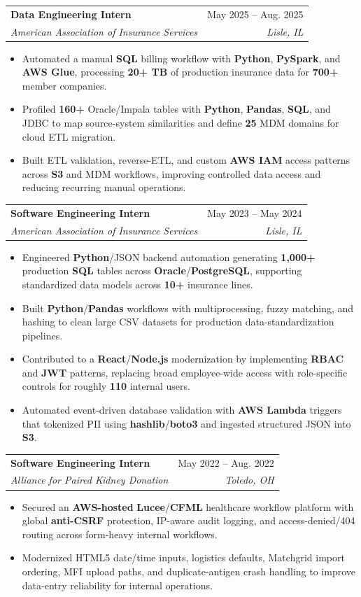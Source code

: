 \documentclass[letterpaper,11pt]{article}
\makeatletter
\newcommand{\resumeItem}[1]{
  \item\small{
    {#1 \vspace{-1pt}}
  }
}
\newcommand{\resumeSubheading}[4]{
  \vspace{-1pt}\item
    \begin{tabular*}{0.97\textwidth}[t]{l@{\extracolsep{\fill}}r}
      \textbf{#1} & #2 \\
      \textit{\small#3} & \textit{\small #4} \\
    \end{tabular*}\vspace{-3pt}
}
\newcommand{\resumeItemListStart}{\begin{itemize}[leftmargin=0.16in, itemsep=0pt, topsep=1pt, parsep=0pt]}
\newcommand{\resumeItemListEnd}{\end{itemize}\vspace{-4pt}}
\makeatother
\begin{document}
    \resumeSubheading
      {Data Engineering Intern}{May 2025 -- Aug. 2025}
      {American Association of Insurance Services}{Lisle, IL}
      \resumeItemListStart
        \resumeItem{Automated a manual \textbf{SQL} billing workflow with \textbf{Python}, \textbf{PySpark}, and \textbf{AWS Glue}, processing \textbf{20+ TB} of production insurance data for \textbf{700+} member companies.}
        \resumeItem{Profiled \textbf{160+} Oracle/Impala tables with \textbf{Python}, \textbf{Pandas}, \textbf{SQL}, and JDBC to map source-system similarities and define \textbf{25} MDM domains for cloud ETL migration.}
        \resumeItem{Built ETL validation, reverse-ETL, and custom \textbf{AWS IAM} access patterns across \textbf{S3} and MDM workflows, improving controlled data access and reducing recurring manual operations.}
      \resumeItemListEnd

    \resumeSubheading
      {Software Engineering Intern}{May 2023 -- May 2024}
      {American Association of Insurance Services}{Lisle, IL}
      \resumeItemListStart
        \resumeItem{Engineered \textbf{Python}/JSON backend automation generating \textbf{1,000+} production \textbf{SQL} tables across \textbf{Oracle}/\textbf{PostgreSQL}, supporting standardized data models across \textbf{10+} insurance lines.}
        \resumeItem{Built \textbf{Python}/\textbf{Pandas} workflows with multiprocessing, fuzzy matching, and hashing to clean large CSV datasets for production data-standardization pipelines.}
        \resumeItem{Contributed to a \textbf{React}/\textbf{Node.js} modernization by implementing \textbf{RBAC} and \textbf{JWT} patterns, replacing broad employee-wide access with role-specific controls for roughly \textbf{110} internal users.}
        \resumeItem{Automated event-driven database validation with \textbf{AWS Lambda} triggers that tokenized PII using \textbf{hashlib}/\textbf{boto3} and ingested structured JSON into \textbf{S3}.}
      \resumeItemListEnd

    \resumeSubheading
      {Software Engineering Intern}{May 2022 -- Aug. 2022}
      {Alliance for Paired Kidney Donation}{Toledo, OH}
      \resumeItemListStart
        \resumeItem{Secured an \textbf{AWS-hosted} \textbf{Lucee}/\textbf{CFML} healthcare workflow platform with global \textbf{anti-CSRF} protection, IP-aware audit logging, and access-denied/404 routing across form-heavy internal workflows.}
        \resumeItem{Modernized HTML5 date/time inputs, logistics defaults, Matchgrid import ordering, MFI upload paths, and duplicate-antigen crash handling to improve data-entry reliability for internal operations.}
      \resumeItemListEnd
\end{document}
